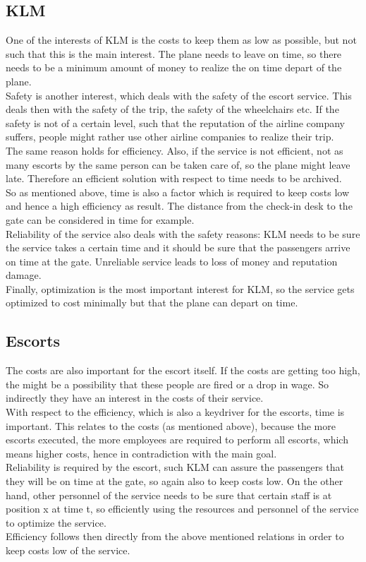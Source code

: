 \documentclass[a4paper, 11pt, notitlepage]{report}
\begin{document}
\subsection{KLM}
One of the interests of KLM is the costs to keep them as low as possible, but not such that this is the main interest. The plane needs to leave on time, so there needs to be a minimum amount of money to realize the on time depart of the plane.\\
Safety is another interest, which deals with the safety of the escort service. This deals then with the safety of the trip, the safety of the wheelchairs etc. If the safety is not of a certain level, such that the reputation of the airline company suffers, people might rather use other airline companies to realize their trip.\\
The same reason holds for efficiency. Also, if the service is not efficient, not as many escorts by the same person can be taken care of, so the plane might leave late. Therefore an efficient solution with respect to time needs to be archived.\\
So as mentioned above, time is also a factor which is required to keep costs low and hence a high efficiency as result. The distance from the check-in desk to the gate can be considered in time for example.\\
Reliability of the service also deals with the safety reasons: KLM needs to be sure the service takes a certain time and it should be sure that the passengers arrive on time at the gate. Unreliable service leads to loss of money and reputation damage.\\
Finally, optimization is the most important interest for KLM, so the service gets optimized to cost minimally but that the plane can depart on time.
\subsection{Escorts}
The costs are also important for the escort itself. If the costs are getting too high, the might be a possibility that these people are fired or a drop in wage. So indirectly they have an interest in the costs of their service.\\
With respect to the efficiency, which is also a keydriver for the escorts, time is important. This relates to the costs (as mentioned above), because the more escorts executed, the more employees are required to perform all escorts, which means higher costs, hence in contradiction with the main goal. \\
Reliability is required by the escort, such KLM can assure the passengers that they will be on time at the gate, so again also to keep costs low. On the other hand, other personnel of the service needs to be sure that certain staff is at position x at time t, so efficiently using the resources and personnel of the service to optimize the service.\\
Efficiency follows then directly from the above mentioned relations in order to keep costs low of the service.
\end{document}

